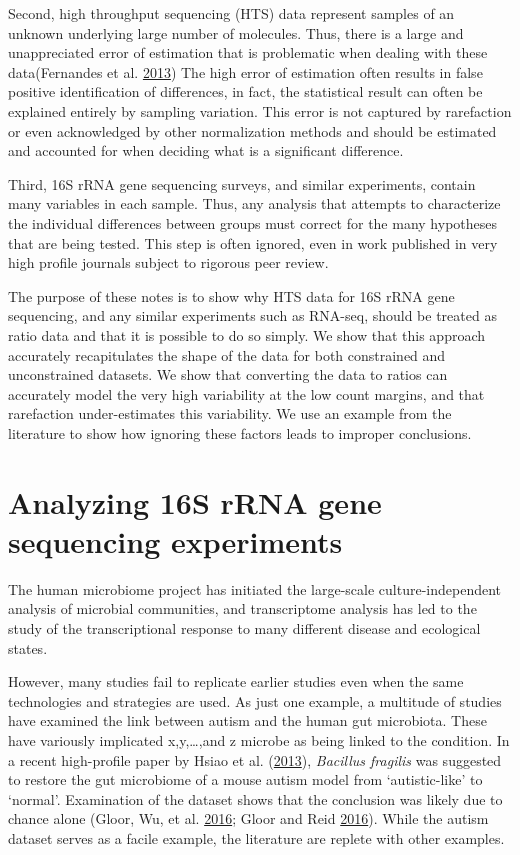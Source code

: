 \documentclass[onecolumn]{book}
\theoremstyle{definition}
\theoremstyle{definition}
\theoremstyle{definition}
\theoremstyle{remark}
\begin{document}
Second, high throughput sequencing (HTS) data represent samples of an
unknown underlying large number of molecules. Thus, there is a large and
unappreciated error of estimation that is problematic when dealing with
these data(Fernandes et al.
\protect\hyperlink{ref-fernandes:2013}{2013}) The high error of
estimation often results in false positive identification of
differences, in fact, the statistical result can often be explained
entirely by sampling variation. This error is not captured by
rarefaction or even acknowledged by other normalization methods and
should be estimated and accounted for when deciding what is a
significant difference.

Third, 16S rRNA gene sequencing surveys, and similar experiments,
contain many variables in each sample. Thus, any analysis that attempts
to characterize the individual differences between groups must correct
for the many hypotheses that are being tested. This step is often
ignored, even in work published in very high profile journals subject to
rigorous peer review.

The purpose of these notes is to show why HTS data for 16S rRNA gene
sequencing, and any similar experiments such as RNA-seq, should be
treated as ratio data and that it is possible to do so simply. We show
that this approach accurately recapitulates the shape of the data for
both constrained and unconstrained datasets. We show that converting the
data to ratios can accurately model the very high variability at the low
count margins, and that rarefaction under-estimates this variability. We
use an example from the literature to show how ignoring these factors
leads to improper conclusions.

\hypertarget{analyzing-16s-rrna-gene-sequencing-experiments}{%
\chapter{Analyzing 16S rRNA gene sequencing
experiments}\label{analyzing-16s-rrna-gene-sequencing-experiments}}

The human microbiome project has initiated the large-scale
culture-independent analysis of microbial communities, and transcriptome
analysis has led to the study of the transcriptional response to many
different disease and ecological states.

However, many studies fail to replicate earlier studies even when the
same technologies and strategies are used. As just one example, a
multitude of studies have examined the link between autism and the human
gut microbiota. These have variously implicated x,y,\ldots{},and z
microbe as being linked to the condition. In a recent high-profile paper
by Hsiao et al. (\protect\hyperlink{ref-Hsiao:2013}{2013}),
\emph{Bacillus fragilis} was suggested to restore the gut microbiome of
a mouse autism model from `autistic-like' to `normal'. Examination of
the dataset shows that the conclusion was likely due to chance alone
(Gloor, Wu, et al. \protect\hyperlink{ref-gloor2016s}{2016}; Gloor and
Reid \protect\hyperlink{ref-Gloor:2016cjm}{2016}). While the autism
dataset serves as a facile example, the literature are replete with
other examples.
\end{document}
